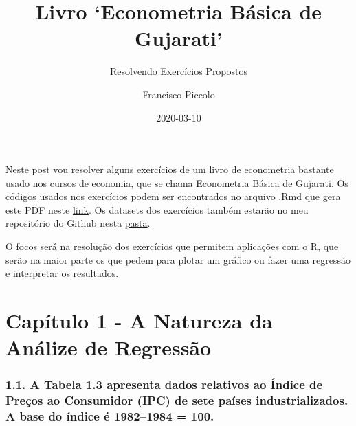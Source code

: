 \documentclass[
  11pt,
  a4paper,
]{article}
\title{Livro `Econometria Básica de Gujarati'}
\subtitle{Resolvendo Exercícios Propostos}
\author{Francisco Piccolo}
\date{2020-03-10}
\begin{document}
\maketitle

Neste post vou resolver alguns exercícios de um livro de econometria bastante usado nos cursos de economia, que se chama \href{https://www.amazon.com.br/Econometria-B\%C3\%A1sica-Damodar-N-Gujarati/dp/8563308327/ref=sr_1_1?__mk_pt_BR=\%C3\%85M\%C3\%85\%C5\%BD\%C3\%95\%C3\%91\&dchild=1\&keywords=econometria+b\%C3\%A1sica+gujarati\&qid=1624149011\&sr=8-1}{Econometria Básica} de Gujarati. Os códigos usados nos exercícios podem ser encontrados no arquivo .Rmd que gera este PDF neste \href{}{link}. Os datasets dos exercícios também estarão no meu repositório do Github nesta \href{}{pasta}.

O focos será na resolução dos exercícios que permitem aplicações com o R, que serão na maior parte os que pedem para plotar um gráfico ou fazer uma regressão e interpretar os resultados.

\hypertarget{capuxedtulo-1---a-natureza-da-anuxe1lize-de-regressuxe3o}{%
\section{Capítulo 1 - A Natureza da Análize de Regressão}\label{capuxedtulo-1---a-natureza-da-anuxe1lize-de-regressuxe3o}}

\hypertarget{a-tabela-1.3-apresenta-dados-relativos-ao-uxedndice-de-preuxe7os-ao-consumidor-ipc-de-sete-pauxedses-industrializados.-a-base-do-uxedndice-uxe9-19821984-100.}{%
\subsubsection{1.1. A Tabela 1.3 apresenta dados relativos ao Índice de Preços ao Consumidor (IPC) de sete países industrializados. A base do índice é 1982--1984 = 100.}\label{a-tabela-1.3-apresenta-dados-relativos-ao-uxedndice-de-preuxe7os-ao-consumidor-ipc-de-sete-pauxedses-industrializados.-a-base-do-uxedndice-uxe9-19821984-100.}}
\end{document}
